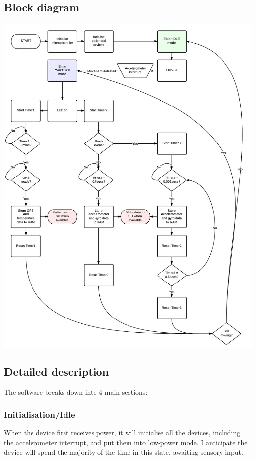 \documentclass[a4paper, twoside]{article}
\begin{document}
\subsection{Block diagram}
\begin{center}
	\includegraphics[scale=0.35]{images/software.jpeg}
\end{center}

\subsection{Detailed description}
The software breaks down into 4 main sections:

\subsubsection{Initialisation/Idle}
When the device first receives power, it will initialise all the devices,
including the accelerometer interrupt, and put them into low-power mode. I
anticipate the device will spend the majority of the time in this state,
awaiting sensory input.
\end{document}
